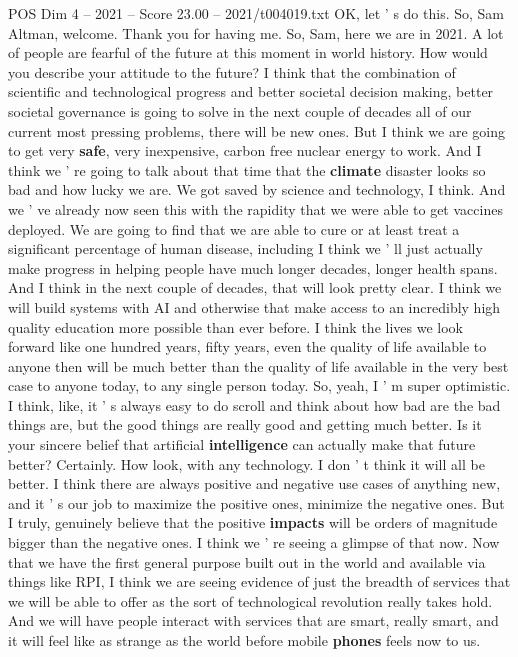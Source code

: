 \begin{textsample}{POS Dim 4 – 2021 – Score 23.00 – 2021/t004019.txt}
OK, let ' s do this.
So, Sam Altman, welcome.
Thank you for having me.
So, Sam, here we are in 2021.
A lot of people are fearful of the future at this moment in world history.
How would you describe your attitude to the future?
I think that the combination of scientific and technological progress and better societal decision making, better societal governance is going to solve in the next couple of decades all of our current most pressing problems, there will be new ones.
But I think we are going to get very \textbf{safe}, very inexpensive, carbon free nuclear energy to work.
And I think we ' re going to talk about that time that the \textbf{climate} disaster looks so bad and how lucky we are.
We got saved by science and technology, I think.
And we ' ve already now seen this with the rapidity that we were able to get vaccines deployed.
We are going to find that we are able to cure or at least treat a significant percentage of human disease, including I think we ' ll just actually make progress in helping people have much longer decades, longer health spans.
And I think in the next couple of decades, that will look pretty clear.
I think we will build systems with AI and otherwise that make access to an incredibly high quality education more possible than ever before.
I think the lives we look forward like one hundred years, fifty years, even the quality of life available to anyone then will be much better than the quality of life available in the very best case to anyone today, to any single person today.
So, yeah, I ' m super optimistic.
I think, like, it ' s always easy to do scroll and think about how bad are the bad things are, but the good things are really good and getting much better.
Is it your sincere belief that artificial \textbf{intelligence} can actually make that future better?
Certainly.
How look, with any technology.
I don ' t think it will all be better.
I think there are always positive and negative use cases of anything new, and it ' s our job to maximize the positive ones, minimize the negative ones.
But I truly, genuinely believe that the positive \textbf{impacts} will be orders of magnitude bigger than the negative ones.
I think we ' re seeing a glimpse of that now.
Now that we have the first general purpose built out in the world and available via things like RPI, I think we are seeing evidence of just the breadth of services that we will be able to offer as the sort of technological revolution really takes hold.
And we will have people interact with services that are smart, really smart, and it will feel like as strange as the world before mobile \textbf{phones} feels now to us.

\end{textsample}
